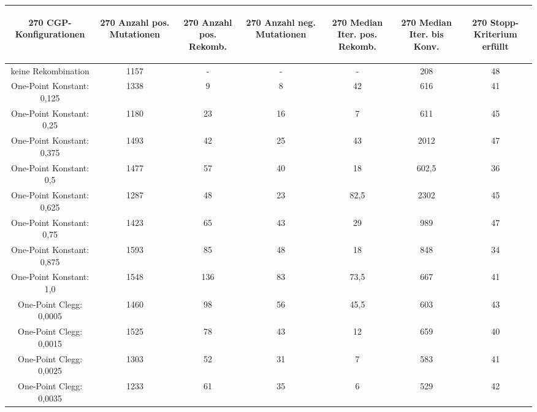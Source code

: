 \begin{table}[H]
	\centering
	\begin{tabular}{c | c | c | c | c | c | c}
		\begin{turn}{270} \textbf{CGP-Konfigurationen} \end{turn} & \begin{turn}{270} \textbf{Anzahl pos. Mutationen} \end{turn} & \begin{turn}{270} \textbf{Anzahl pos. Rekomb.} \end{turn} & \begin{turn}{270} \textbf{Anzahl neg. Mutationen} \end{turn} & \begin{turn}{270} \textbf{Median Iter. pos. Rekomb.} \end{turn} & \begin{turn}{270} \textbf{Median Iter. bis Konv.} \end{turn} & \begin{turn}{270} \textbf{Stopp-Kriterium erfüllt} \end{turn}\\
		\hline
		keine Rekombination & 1157 & - & - & - & 208 & 48\\
		\hline
		One-Point Konstant: 0,125 & 1338 & 9 & 8 & 42 & 616 & 41\\
		\hline
		One-Point Konstant: 0,25 & 1180 & 23 & 16 & 7 & 611 & 45\\
		\hline
		One-Point Konstant: 0,375 & 1493 & 42 & 25 & 43 & 2012 & 47\\
		\hline
		One-Point Konstant: 0,5 & 1477 & 57 & 40 & 18 & 602,5 & 36\\
		\hline
		One-Point Konstant: 0,625 & 1287 & 48 & 23 & 82,5 & 2302 & 45\\
		\hline
		One-Point Konstant: 0,75 & 1423 & 65 & 43 & 29 & 989 & 47\\
		\hline
		One-Point Konstant: 0,875 & 1593 & 85 & 48 & 18 & 848 & 34\\
		\hline
		One-Point Konstant: 1,0 & 1548 & 136 & 83 & 73,5 & 667 & 41\\
		\hline
		One-Point Clegg: 0,0005 & 1460 & 98 & 56 & 45,5 & 603 & 43\\
		\hline
		One-Point Clegg: 0,0015 & 1525 & 78 & 43 & 12 & 659 & 40\\
		\hline
		One-Point Clegg: 0,0025 & 1303 & 52 & 31 & 7 & 583 & 41\\
		\hline
		One-Point Clegg: 0,0035 & 1233 & 61 & 35 & 6 & 529 & 42\\

\end{tabular}
\end{table}
